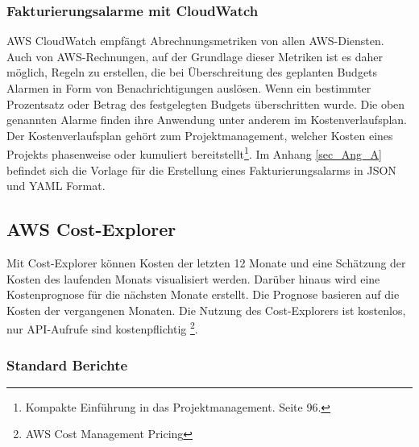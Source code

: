\subsubsection*{Fakturierungsalarme mit CloudWatch}
AWS CloudWatch empfängt Abrechnungsmetriken von allen AWS-Diensten. Auch von AWS-Rechnungen, auf der Grundlage dieser Metriken ist es daher möglich, Regeln zu erstellen, die bei Überschreitung des geplanten Budgets Alarmen in Form von Benachrichtigungen auslösen.
Wenn ein bestimmter Prozentsatz oder Betrag des festgelegten Budgets überschritten wurde. Die oben genannten Alarme finden ihre Anwendung unter anderem im Kostenverlaufsplan. Der Kostenverlaufsplan gehört zum Projektmanagement, welcher Kosten eines Projekts phasenweise oder kumuliert bereitstellt\footnote{\cite{PM1}Kompakte Einführung in das Projektmanagement. Seite 96.}. Im Anhang \ref{sec_Ang_A} befindet sich die Vorlage für die Erstellung eines Fakturierungsalarms in JSON und YAML Format.
\subsection{AWS Cost-Explorer}\label{ssec:Cost-Explorer}
Mit Cost-Explorer können Kosten der letzten 12 Monate und eine Schätzung der Kosten des laufenden Monats visualisiert werden. Darüber hinaus wird eine Kostenprognose für die nächsten Monate erstellt. Die Prognose basieren auf die Kosten der vergangenen Monaten. Die Nutzung des Cost-Explorers ist kostenlos, nur API-Aufrufe sind kostenpflichtig \footnote{{\cite{AMZ22}AWS Cost Management Pricing}}.
\\

\subsubsection*{Standard Berichte}
